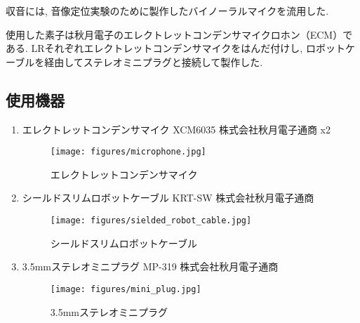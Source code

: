 収音には, 音像定位実験のために製作したバイノーラルマイクを流用した. 

使用した素子は秋月電子のエレクトレットコンデンサマイクロホン（ECM）である. LRそれぞれエレクトレットコンデンサマイクをはんだ付けし, ロボットケーブルを経由してステレオミニプラグと接続して製作した. 

\subsection{使用機器}\label{used-equipments-mic}
  \begin{enumerate}
  \renewcommand{\labelenumi}{(\arabic{enumi})}
  \item
    エレクトレットコンデンサマイク XCM6035 株式会社秋月電子通商
    \cite{XCM6035:online} x2
    \begin{figure}[H]
      \centering
      \texttt{[image: figures/microphone.jpg]}
      \caption{エレクトレットコンデンサマイク}
      \label{fig:microphone}
    \end{figure}
  \item
    シールドスリムロボットケーブル KRT-SW 株式会社秋月電子通商
    \cite{sield_slim_robot_cable:online}
    \begin{figure}[H]
      \centering
      \texttt{[image: figures/sielded\_robot\_cable.jpg]}
      \caption{シールドスリムロボットケーブル}
      \label{fig:sield_slim_robot_cable}
    \end{figure}
  \item
    3.5mmステレオミニプラグ MP-319 株式会社秋月電子通商
    \begin{figure}[H]
      \centering
      \texttt{[image: figures/mini\_plug.jpg]}
      \caption{3.5mmステレオミニプラグ}
      \label{fig:mini_plug}
    \end{figure}
  \end{enumerate}

